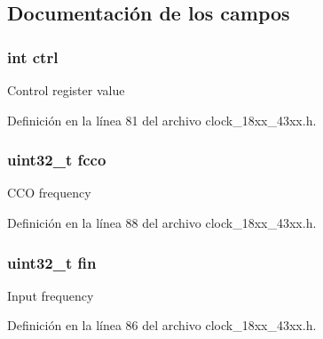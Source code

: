 \subsection{Documentación de los campos}
\subsubsection[{\texorpdfstring{ctrl}{ctrl}}]{\setlength{\rightskip}{0pt plus 5cm}int ctrl}\hypertarget{struct_p_l_l___p_a_r_a_m___t_a0f787778e7019ca3a8bdf0bd17b9efca}{}\label{struct_p_l_l___p_a_r_a_m___t_a0f787778e7019ca3a8bdf0bd17b9efca}
Control register value 

Definición en la línea 81 del archivo clock\+\_\+18xx\+\_\+43xx.\+h.

\subsubsection[{\texorpdfstring{fcco}{fcco}}]{\setlength{\rightskip}{0pt plus 5cm}uint32\+\_\+t fcco}\hypertarget{struct_p_l_l___p_a_r_a_m___t_a95fa8353e67576bbba4c6bfb87adecc9}{}\label{struct_p_l_l___p_a_r_a_m___t_a95fa8353e67576bbba4c6bfb87adecc9}
C\+CO frequency 

Definición en la línea 88 del archivo clock\+\_\+18xx\+\_\+43xx.\+h.

\subsubsection[{\texorpdfstring{fin}{fin}}]{\setlength{\rightskip}{0pt plus 5cm}uint32\+\_\+t fin}\hypertarget{struct_p_l_l___p_a_r_a_m___t_af5a04d171f69a163802bae85897b7fd0}{}\label{struct_p_l_l___p_a_r_a_m___t_af5a04d171f69a163802bae85897b7fd0}
Input frequency 

Definición en la línea 86 del archivo clock\+\_\+18xx\+\_\+43xx.\+h.

